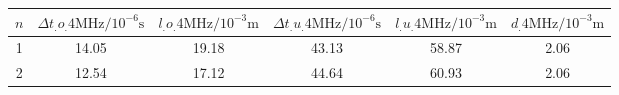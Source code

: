 \label{tab:tabAScan4MHz}
	\begin{tabular}{S[table-format=1.0]S[table-format=2.2]S[table-format=2.2]S[table-format=2.2]S[table-format=2.2]S[table-format=2.2]}
		\toprule
		{$n$} & {$\Delta t_.{o_.{4\si{\mega\hertz}}}/10^{-6}\si{\second}$} & {$l_.{o_.{4\si{\mega\hertz}}}/10^{-3}\si{\metre}$} & {$\Delta t_.{u_.{4\si{\mega\hertz}}}/10^{-6}\si{\second}$} & {$l_.{u_.{4\si{\mega\hertz}}}/10^{-3}\si{\metre}$} & {$d_.{4\si{\mega\hertz}}/10^{-3}\si{\metre}$} \\
		 & 14.05 & 19.18 & 43.13 & 58.87 & 2.06 \\
		2 & 12.54 & 17.12 & 44.64 & 60.93 & 2.06 \\
		\bottomrule
	\end{tabular}
